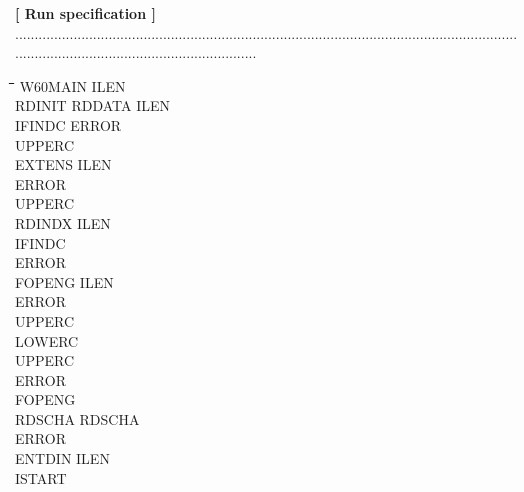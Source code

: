 \strut\hfill {\bf [ Run specification ]}\\
...............................................................................................................................................................................................\-\nwln
\begin{tabbing}
\hspace{1.27cm}\=\hspace{1.27cm}\=\hspace{1.27cm}\=\hspace{1.27cm}\=%
\hspace{1.27cm}\=\hspace{1.27cm}\=\hspace{1.27cm}\=\hspace{1.27cm}\=%
\hspace{1.27cm}\=\hspace{1.27cm}\=\kill
W60MAIN\> ILEN\\
\>\> RDINIT\> \> RDDATA\> \> ILEN\\
\>\> \> \> IFINDC\> \> ERROR\\
\>\> \> \> UPPERC\\
\>\> \> \> EXTENS\> \> ILEN\\
\>\> \> \> \> \> ERROR\\
\>\> \> \> \> \> UPPERC\\
\>\> \> \> RDINDX\> \> ILEN\\
\>\> \> \> \> \> IFINDC\\
\>\> \> \> \> \> ERROR\\
\>\> \> \> \> \> FOPENG\> \> ILEN\\
\>\> \> \> \> \> \> \> ERROR\\
\>\> \> \> \> \> \> \> UPPERC\\
\>\> \> \> \> \> \> \> LOWERC\\
\>\> \> \> \> \> UPPERC\\
\>\> \> \> ERROR\\
\>\> \> \> FOPENG\\
\>\> RDSCHA\> \> RDSCHA\\
\>\> ERROR\\
\>\> ENTDIN\> \> ILEN\\
\>\> \> \> ISTART
\end{tabbing}

